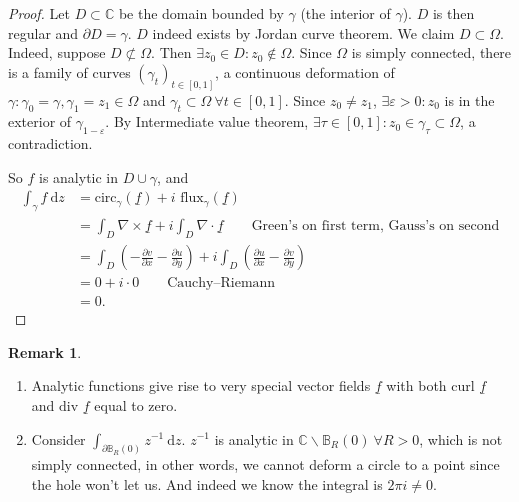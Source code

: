 \documentclass[a4paper]{article}
\theoremstyle{definition}
\newtheorem*{remark}{Remark}
\begin{document}
\begin{proof}
Let $D\subset \mathbb C$ be the domain bounded by $\gamma$ (the interior of $\gamma$). $D$ is then regular and $\partial D=\gamma$. $D$ indeed exists by Jordan curve theorem. We claim $D\subset \Omega$. Indeed, suppose $D\not\subset \Omega$. Then $\exists z_0 \in D:z_0 \not\in \Omega$. Since $\Omega$ is simply connected, there is a family of curves $(\gamma_t)_{t\in [0,1]}$, a continuous deformation of $\gamma : \gamma_0=\gamma, \gamma_1=z_1 \in \Omega$ and $\gamma_t \subset \Omega \ \forall t\in [0,1]$. Since $z_0\neq z_1$, $\exists \varepsilon >0: z_0$ is in the exterior of $\gamma_{1-\varepsilon}$. By Intermediate value theorem, $\exists \tau \in [0,1]:z_0\in \gamma_\tau \subset \Omega$, a contradiction.

\begin{center}
\end{center}

So $f$ is analytic in $D\cup \gamma$, and
\[
\begin{aligned}
\int_\gamma f \ \mathrm d z &= \text{circ}_\gamma (\underline f) +i \text{ flux}_\gamma (\underline f) \\ &= \int_D \nabla \times \underline f + i\int_D \nabla \cdot \underline f \qquad \text{Green's on first term, Gauss's on second} \\
&=\int_D \left( -\frac{\partial v}{\partial x}-\frac{\partial u}{\partial y}\right)+ i\int_D \left(\frac{\partial u}{\partial x}-\frac{\partial v}{\partial y} \right) \\&=0+i\cdot 0 \qquad \text{Cauchy–Riemann} \\&= 0.
\end{aligned}
\]
\end{proof}
\begin{remark}
\begin{enumerate}
    \item Analytic functions give rise to very special vector fields $\underline f$ with both $\text{curl }\underline f$ and $\text{div }\underline f$ equal to zero.
    \item Consider $\int_{\partial \mathbb B_R(0)} z^{-1} \ \mathrm d z$. $z^{-1}$ is analytic in $\mathbb C \backslash \mathbb B_R(0) \ \forall R>0$, which is not simply connected, in other words, we cannot deform a circle to a point since the hole won't let us. And indeed we know the integral is $2\pi i \neq 0$.
\end{enumerate}
\end{remark}
\end{document}
